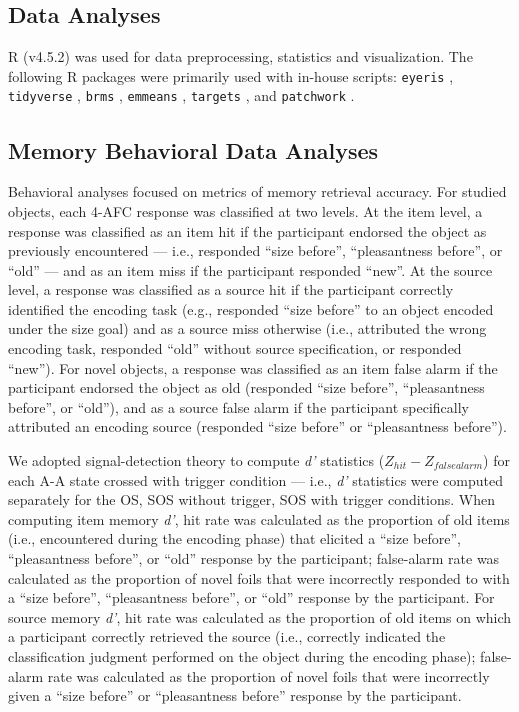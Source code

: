 \subsection{Data Analyses}

R (v4.5.2) was used for data preprocessing, statistics and visualization. The following R packages were primarily used with in-house scripts: \texttt{eyeris} \parencite{schwartz2025eyeris,schwartz2025eyerispaper}, \texttt{tidyverse} \parencite{wickham2019welcome}, \texttt{brms} \parencite{burkner2017brms}, \texttt{emmeans} \parencite{lenth2019emmeans}, \texttt{targets} \parencite{landau2021targets}, and \texttt{patchwork} \parencite{pedersen2025patchwork}.

\subsection{Memory Behavioral Data Analyses}

Behavioral analyses focused on metrics of memory retrieval accuracy. For studied objects, each 4-AFC response was classified at two levels. At the item level, a response was classified as an item hit if the participant endorsed the object as previously encountered — i.e., responded ``size before'', ``pleasantness before'', or ``old'' — and as an item miss if the participant responded ``new''. At the source level, a response was classified as a source hit if the participant correctly identified the encoding task (e.g., responded ``size before'' to an object encoded under the size goal) and as a source miss otherwise (i.e., attributed the wrong encoding task, responded ``old'' without source specification, or responded ``new''). For novel objects, a response was classified as an item false alarm if the participant endorsed the object as old (responded ``size before'', ``pleasantness before'', or ``old''), and as a source false alarm if the participant specifically attributed an encoding source (responded ``size before'' or ``pleasantness before''). 

We adopted signal-detection theory \parencite{green1988signal} to compute \textit{d'} statistics ($Z_{hit} - Z_{falsealarm}$) for each A-A state crossed with trigger condition –– i.e., \textit{d'} statistics were computed separately for the OS, SOS without trigger, SOS with trigger conditions. When computing item memory \textit{d'}, hit rate was calculated as the proportion of old items (i.e., encountered during the encoding phase) that elicited a ``size before'', ``pleasantness before'', or ``old'' response by the participant; false-alarm rate was calculated as the proportion of novel foils that were incorrectly responded to with a ``size before'', ``pleasantness before'', or ``old'' response by the participant. For source memory \textit{d'}, hit rate was calculated as the proportion of old items on which a participant correctly retrieved the source (i.e., correctly indicated the classification judgment performed on the object during the encoding phase); false-alarm rate was calculated as the proportion of novel foils that were incorrectly given a ``size before'' or ``pleasantness before'' response by the participant. 

